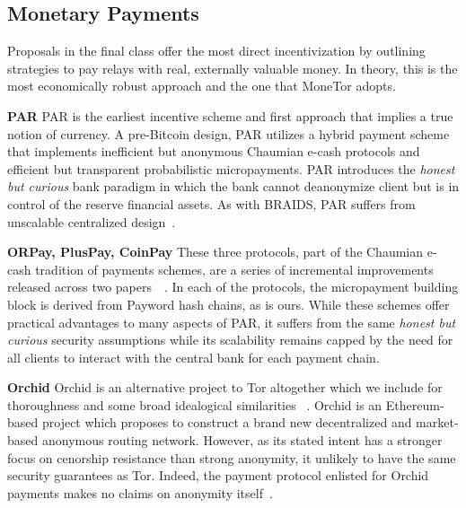\subsection{Monetary Payments}

Proposals in the final class offer the most direct incentivization by outlining
strategies to pay relays with real, externally valuable money. In theory, this
is the most economically robust approach and the one that MoneTor adopts.

\textbf{PAR} PAR is the earliest incentive scheme and first approach that
implies a true notion of currency. A pre-Bitcoin design, PAR utilizes a hybrid
payment scheme that implements inefficient but anonymous Chaumian e-cash
protocols and efficient but transparent probabilistic micropayments. PAR
introduces the \emph{honest but curious} bank paradigm in which the bank cannot
deanonymize client but is in control of the reserve financial assets. As with
BRAIDS, PAR suffers from unscalable centralized design~\cite{androulaki2008payment}.

\textbf{ORPay, PlusPay, CoinPay} These three protocols, part of the Chaumian
e-cash tradition of payments schemes, are a series of incremental improvements
released across two papers~\cite{chen2009xpay}~\cite{carbunar2012tipping}. In
each of the protocols, the micropayment building block is derived from Payword
hash chains, as is ours. While these schemes offer practical advantages to many
aspects of PAR, it suffers from the same \emph{honest but curious} security
assumptions while its scalability remains capped by the need for all clients to
interact with the central bank for each payment chain.

\textbf{Orchid} Orchid is an alternative project to Tor altogether which we
include for thoroughness and some broad idealogical similarities
~\cite{salamon2018orchid}. Orchid is an Ethereum-based project which proposes to
construct a brand new decentralized and market-based anonymous routing
network. However, as its stated intent has a stronger focus on cenorship
resistance than strong anonymity, it unlikely to have the same security
guarantees as Tor. Indeed, the payment protocol enlisted for Orchid payments
makes no claims on anonymity itself~\cite{pass2015micropayments}.